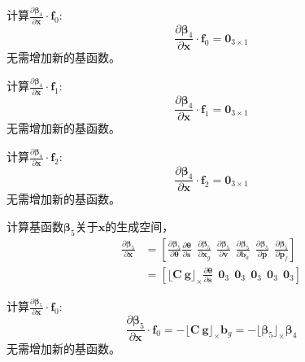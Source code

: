 \documentclass{article}
\begin{document}
\par
计算$\frac{\partial\mathbf{\beta}_4}{\partial\textbf{x}}\cdot\textbf{f}_0$:
\begin{equation}
    \frac{\partial\mathbf{\beta}_4}{\partial\textbf{x}}\cdot\textbf{f}_0=\textbf{0}_{3\times 1}
\end{equation}
无需增加新的基函数。

\par
计算$\frac{\partial\mathbf{\beta}_4}{\partial\textbf{x}}\cdot\textbf{f}_1$:
\begin{equation}
    \frac{\partial\mathbf{\beta}_4}{\partial\textbf{x}}\cdot\textbf{f}_1=\textbf{0}_{3\times 1}
\end{equation}
无需增加新的基函数。

\par
计算$\frac{\partial\mathbf{\beta}_4}{\partial\textbf{x}}\cdot\textbf{f}_2$:
\begin{equation}
    \frac{\partial\mathbf{\beta}_4}{\partial\textbf{x}}\cdot\textbf{f}_2=\textbf{0}_{3\times 1}
\end{equation}
无需增加新的基函数。


\par
计算基函数$\mathbf{\beta}_5$关于$\textbf{x}$的生成空间，
\begin{equation}
    \begin{array}{ll}\frac{\partial\mathbf{\beta}_5}{\partial\textbf{x}}
        &=\left[\frac{\partial\mathbf{\beta}_5}{\partial\mathbf{\theta}}\frac{\partial\mathbf{\theta}}{\partial\textbf{s}}
        \ \ \frac{\partial\mathbf{\beta}_5}{\partial\textbf{x}_{g}}\ \ \frac{\partial\mathbf{\beta}_5}{\partial\textbf{v}}
        \ \ \frac{\partial\mathbf{\beta}_5}{\partial\textbf{b}_{a}}\ \ \frac{\partial\mathbf{\beta}_5}{\partial\textbf{p}}
        \ \ \frac{\partial\mathbf{\beta}_5}{\partial\textbf{p}_f}\right]\\
        &=\left[\lfloor\textbf{C}\ \textbf{g}\rfloor_{\times}\frac{\partial\mathbf{\theta}}{\partial\textbf{s}}
        \ \ \textbf{0}_3\ \ \textbf{0}_3\ \ \textbf{0}_3\ \ \textbf{0}_3\ \ \textbf{0}_3\right]
    \end{array}
\end{equation}

\par
计算$\frac{\partial\mathbf{\beta}_5}{\partial\textbf{x}}\cdot\textbf{f}_0$:
\begin{equation}
    \frac{\partial\mathbf{\beta}_5}{\partial\textbf{x}}\cdot\textbf{f}_0
    =-\lfloor\textbf{C}\ \textbf{g}\rfloor_{\times}\textbf{b}_{g}
    =-\lfloor\mathbf{\beta}_5\rfloor_{\times}\mathbf{\beta}_4
\end{equation}
无需增加新的基函数。
\end{document}
